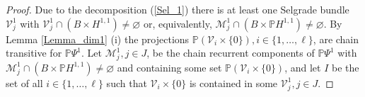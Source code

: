 	\begin{proof}
		Due to the decomposition (\ref{Sel_1}) there is at least one Selgrade bundle
		$\mathcal{V}_{j}^{1}$ with $\mathcal{V}_{j}^{1}\cap(B\times H^{1,1}%
		)\not =\varnothing$ or, equivalently, $\mathcal{M}_{j}^{1}\cap\left(
		B\times\mathbb{P}H^{1,1}\right)  \not =\varnothing$. By Lemma \ref{Lemma_dim1}%
		(i) the projections $\mathbb{P}\left(  \mathcal{V}_{i}\times\{0\}\right)
		,i\in\{1,\ldots,\ell\}$, are chain transitive for $\mathbb{P}\Psi^{1}$. Let
		$\mathcal{M}_{j}^{1},j\in J$, be the chain recurrent components of
		$\mathbb{P}\Psi^{1}$ with $\mathcal{M}_{j}^{1}\cap\left(  B\times
		\mathbb{P}H^{1,1}\right)  \not =\varnothing$ and containing some set
		$\mathbb{P}\left(  \mathcal{V}_{i}\times\{0\}\right)  $, and let $I$ be the
		set of all $i\in\{1,\ldots,\ell\}$ such that $\mathcal{V}_{i}\times\{0\}$ is
		contained in some $\mathcal{V}_{j}^{1},j\in J$.
		

\end{proof}
